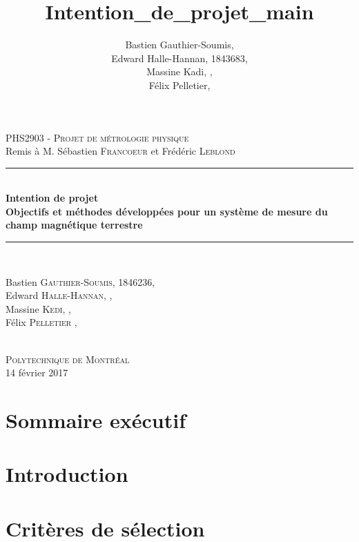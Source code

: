 \documentclass[11pt,a4paper]{article}
\author{Bastien Gauthier-Soumis,\\
 Edward Halle-Hannan, 1843683,\\
Massine Kadi, ,\\
Félix Pelletier, }
\title{Intention_de_projet_main}
\begin{document}
\begin{titlepage}
	\begin{flushright}
\def\logoscale{0.5}


\end{flushright}
\begin{center}
	\textsc{\Large{PHS2903 - Projet de métrologie physique}}\\
    \large{Remis à M. Sébastien \textsc{Francoeur} et Frédéric \textsc{Leblond}  }\\
    [1.5cm]
	\rule{\linewidth}{0.5mm} \\ %
	[0.4cm]
    \Large{\bfseries Intention de projet} \\
	\huge{\bfseries Objectifs et méthodes développées pour un système de mesure du champ magnétique terrestre} \\
	[0.4cm]
   
	\rule{\linewidth}{0.5mm} \\ %
	[1.5cm]
	\begin{minipage}{10cm}
		\begin{center}
		\large{Bastien \textsc{Gauthier-Soumis}, 1846236,\\
		 Edward \textsc{Halle-Hannan}, ,\\
		Massine \textsc{Kedi}, ,\\
		Félix \textsc{Pelletier} ,\\}
		
      
		\end{center}
	\end{minipage}
	~\\
	[1.5cm]
	\vfill
	\textsc{\Large{Polytechnique de Montréal}}\\ 
	\Large{14 février 2017}\\%
\end{center}
\end{titlepage}


\section{Sommaire exécutif}

\section{Introduction}



\section{Critères de sélection}

\end{document}

